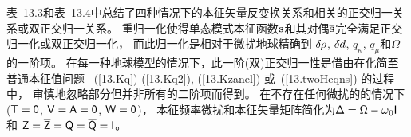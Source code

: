 {{{%

表~13.3和表~13.4中总结了四种情况下的本征矢量反变换关系和相关的正交归一关系或双正交归一关系。 
重归一化使得单态模式本征函数$\mbox{${\bf s}$}$和其对偶$\overline{\mbox{${\bf s}$}}$完全满足正交归一化或双正交归一化，
而此归一化是相对于微扰地球精确到
$\delta\hspace{-0.2 mm}\rho$,
$\delta\hspace{-0.1 mm}d$, $q_{\kappa}$, $q_{\mu}$和$\Omega$
的一阶项。
在每一种地球模型的情况下，此一阶(双)正交归一性是借由在化简至普通本征值问题
~(\ref{13.Kq})
(\ref{13.Kq2}),
(\ref{13.Kzanel}) 或~(\ref{13.twoHeqns})
的过程中，
审慎地忽略部分但并非所有的二阶项而得到。
在不存在任何微扰的的情况下($\mbox{${\sf T}$}=\mbox{${\sf 0}$}$, $\mbox{${\sf V}$}=\mbox{${\sf A}$}=\mbox{${\sf 0}$}$, $\mbox{${\sf W}$}=\mbox{${\sf 0}$}$)，
本征频率微扰和本征矢量矩阵简化为$
\mbox{${\sf \Delta}$}=\mbox{${\sf \Omega}$}-\mbox{$\omega$}_0\mbox{${\sf I}$}$
和 $\mbox{${\sf Z}$}=\overline{\mbox{${\sf Z}$}}=\mbox{${\sf Q}$}=\overline{\mbox{${\sf Q}$}}=\mbox{${\sf I}$}$。

}}}
